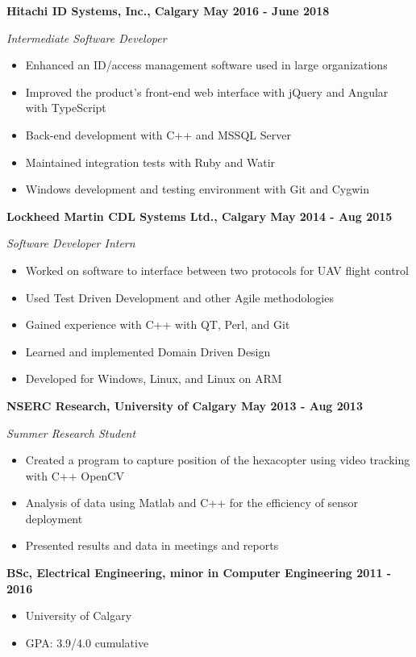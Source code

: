 \documentclass[12pt]{article}
\begin{document}
\noindent \centerline{ \bf Hitachi ID Systems, Inc., Calgary \hfill May 2016 - June 2018}
\indent \emph{ Intermediate Software Developer }
\begin{itemize}
  \item Enhanced an ID/access management software used in large organizations
  \item Improved the product's front-end web interface with jQuery and Angular with TypeScript
  \item Back-end development with C++ and MSSQL Server
  \item Maintained integration tests with Ruby and Watir
  \item Windows development and testing environment with Git and Cygwin
\end{itemize}
\medskip

\pagebreak
\noindent \centerline{ \bf Lockheed Martin CDL Systems Ltd., Calgary \hfill May 2014 - Aug 2015}
\indent \emph{ Software Developer Intern }
\begin{itemize}
  \item Worked on software to interface between two protocols for UAV flight control
  \item Used Test Driven Development and other Agile methodologies
  \item Gained experience with C++ with QT, Perl, and Git
  \item Learned and implemented Domain Driven Design
  \item Developed for Windows, Linux, and Linux on ARM
\end{itemize}
\medskip

\noindent \centerline{ \bf NSERC Research, University of Calgary \hfill May 2013 - Aug 2013}
\indent \emph{ Summer Research Student }
\begin{itemize}
  \item Created a program to capture position of the hexacopter using video tracking with C++ OpenCV
  \item Analysis of data using Matlab and C++ for the efficiency of sensor deployment
  \item Presented results and data in meetings and reports
\end{itemize}

\bigskip
{}
\medskip

\noindent \centerline{ \bf BSc, Electrical Engineering, minor in Computer Engineering  \hfill 2011 - 2016}
\begin{itemize}[parsep=0pt,partopsep=0pt]
  \item University of Calgary
  \item GPA: 3.9/4.0 cumulative
\end{itemize}
\end{document}
